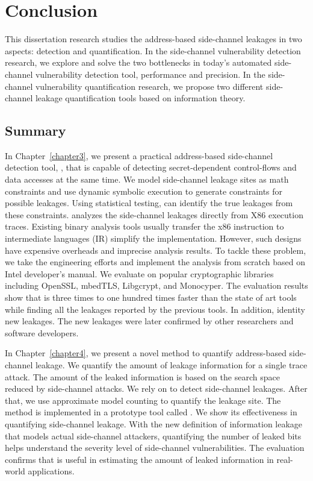 \chapter{Conclusion}\label{chapter6}
This dissertation research studies the address-based side-channel leakages in two aspects: detection and quantification. In the side-channel vulnerability detection research, we explore and solve the two bottlenecks in today's automated side-channel vulnerability detection tool, performance and precision. In the side-channel vulnerability quantification research, we propose two different side-channel leakage quantification tools based on information theory. 

\section{Summary}

In Chapter~\ref{chapter3}, we present a practical address-based side-channel detection tool, \detect{}, that is capable of detecting secret-dependent control-flows and data accesses at the same time. We model side-channel leakage sites as math constraints and use dynamic symbolic execution to generate constraints for possible leakages. Using statistical testing, \detect{} can identify the true leakages from these constraints. \detect{} analyzes the side-channel leakages directly from X86 execution traces. Existing binary analysis tools usually transfer the x86 instruction to intermediate languages (IR) simplify the implementation. However, such designs have expensive overheads and imprecise analysis results. To tackle these problem, we take the engineering efforts and implement the analysis from scratch  based on Intel developer's manual. We evaluate \detect{} on popular cryptographic libraries including OpenSSL, mbedTLS, Libgcrypt, and Monocyper. The evaluation results show that \detect{} is three times to one hundred times faster than the state of art tools while finding all the leakages reported by the previous tools. In addition, \detect{} identity new leakages. The new leakages were later confirmed by other researchers and software developers.  

In Chapter~\ref{chapter4}, we present a novel method to quantify address-based side-channel leakage. We quantify the amount of leakage information for a single trace attack. The amount of the leaked information is based on the search space reduced by side-channel attacks. We rely on \detect{} to detect side-channel leakages. After that, we use approximate model counting to quantify the leakage site. The method is implemented in a prototype tool called \tool{}. We show its effectiveness in quantifying side-channel leakage. With the new definition of information leakage that models actual side-channel attackers, quantifying the number of leaked bits helps understand the severity level of side-channel vulnerabilities. The evaluation confirms that \tool{} is useful in estimating the amount of leaked information in real-world applications.

